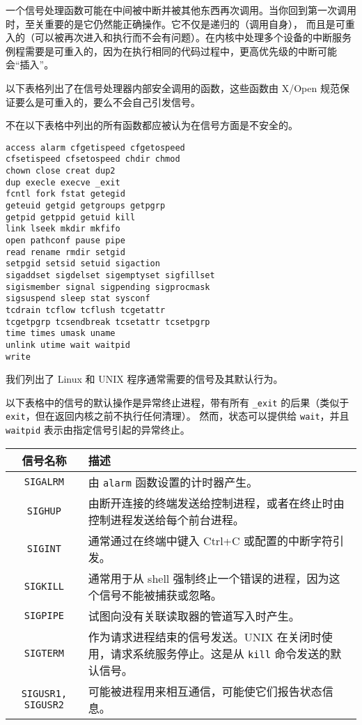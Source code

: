 \documentclass{ctexart}
\begin{document}
一个信号处理函数可能在中间被中断并被其他东西再次调用。当你回到第一次调用时，至关重要的是它仍然能正确操作。它不仅是递归的（调用自身），
而且是可重入的（可以被再次进入和执行而不会有问题）。在内核中处理多个设备的中断服务例程需要是可重入的，因为在执行相同的代码过程中，更高优先级的中断可能会“插入”。  
  
以下表格列出了在信号处理器内部安全调用的函数，这些函数由 X/Open 规范保证要么是可重入的，要么不会自己引发信号。  
  
不在以下表格中列出的所有函数都应被认为在信号方面是不安全的。  
  
\begin{verbatim}  
access alarm cfgetispeed cfgetospeed  
cfsetispeed cfsetospeed chdir chmod  
chown close creat dup2  
dup execle execve _exit  
fcntl fork fstat getegid  
geteuid getgid getgroups getpgrp  
getpid getppid getuid kill  
link lseek mkdir mkfifo  
open pathconf pause pipe  
read rename rmdir setgid  
setpgid setsid setuid sigaction  
sigaddset sigdelset sigemptyset sigfillset  
sigismember signal sigpending sigprocmask  
sigsuspend sleep stat sysconf  
tcdrain tcflow tcflush tcgetattr  
tcgetpgrp tcsendbreak tcsetattr tcsetpgrp  
time times umask uname  
unlink utime wait waitpid  
write  
\end{verbatim}  

我们列出了 Linux 和 UNIX 程序通常需要的信号及其默认行为。  
  
以下表格中的信号的默认操作是异常终止进程，带有所有 \texttt{\_exit} 的后果（类似于 \texttt{exit}，但在返回内核之前不执行任何清理）。
然而，状态可以提供给 \texttt{wait}，并且 \texttt{waitpid} 表示由指定信号引起的异常终止。  
  
\begin{tabular}{|c|p{6cm}|}  
\hline  
\textbf{信号名称} & \textbf{描述} \\  
\hline  
\texttt{SIGALRM} & 由 \texttt{alarm} 函数设置的计时器产生。 \\  
\hline  
\texttt{SIGHUP} & 由断开连接的终端发送给控制进程，或者在终止时由控制进程发送给每个前台进程。 \\  
\hline  
\texttt{SIGINT} & 通常通过在终端中键入 Ctrl+C 或配置的中断字符引发。 \\  
\hline  
\texttt{SIGKILL} & 通常用于从 shell 强制终止一个错误的进程，因为这个信号不能被捕获或忽略。 \\  
\hline  
\texttt{SIGPIPE} & 试图向没有关联读取器的管道写入时产生。 \\  
\hline  
\texttt{SIGTERM} & 作为请求进程结束的信号发送。UNIX 在关闭时使用，请求系统服务停止。这是从 \texttt{kill} 命令发送的默认信号。 \\  
\hline  
\texttt{SIGUSR1, SIGUSR2} & 可能被进程用来相互通信，可能使它们报告状态信息。 \\  
\hline  
\end{tabular}  
  
\end{document}
